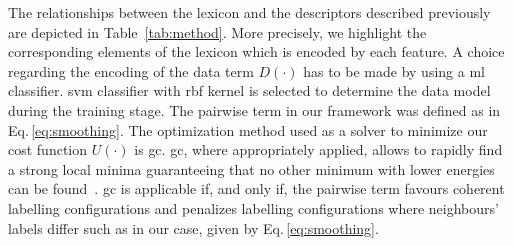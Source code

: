 The relationships between the lexicon and the descriptors described previously are depicted in Table~\ref{tab:method}. More precisely, we highlight the corresponding elements of the lexicon which is encoded by each feature. A choice regarding the encoding of the data term $D(\cdot)$ has to be made by using a \ac{ml} classifier. \ac{svm} classifier with \ac{rbf} kernel is selected to determine the data model during the training stage. The pairwise term in our framework was defined as in Eq.\,\eqref{eq:smoothing}. The optimization method used as a solver to minimize our cost function $U(\cdot)$ is \ac{gc}. \ac{gc}, where appropriately applied, allows to rapidly find a strong local minima guaranteeing that no other minimum with lower energies can be found~\cite{delong2012fast}. \ac{gc} is applicable if, and only if, the pairwise term favours coherent labelling configurations and penalizes labelling configurations where neighbours' labels differ such as in our case, given by Eq.\,\eqref{eq:smoothing}.
